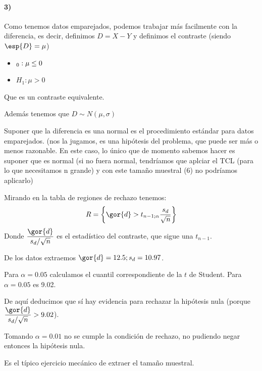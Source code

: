 \begin{problem}[6]
\paragraph{3)} Como tenemos datos emparejados, podemos trabajar más facilmente con la diferencia, es decir, definimos $D=X-Y$ y definimos el contraste (siendo $\esp{D}=\mu$)
\begin{itemize}
\item $\Huge_0 : \mu \leq 0$
\item $H_1: \mu >0$
\end{itemize}

Que es un contraste equivalente.

Además tenemos que $D \sim N(\mu,\sigma)$ 

Suponer que la diferencia es una normal es el procedimiento estándar para datos emparejados. (nos la jugamos, es una hipótesis del problema, que puede ser más o menos razonable. En este caso, lo único que de momento sabemos hacer es suponer que es normal (si no fuera normal, tendríamos que aplciar el TCL (para lo que necesitamos n grande) y con este tamaño muestral (6) no podríamos aplicarlo)

Mirando en la tabla de regiones de rechazo tenemos:
\[R = \left\{\gor{d}> t_{n-1;\alpha} \frac{s_d}{\sqrt{n}}\right\}\]
Donde $\displaystyle \frac{\gor{d}}{s_d/\sqrt{n}}$ es el estadístico del contraste, que sigue una $t_{n-1}$.

De los datos extraemos $\gor{d} = 12.5;s_d=10.97$.

Para $\alpha = 0.05$ calculamos el cuantil correspondiente de la $t$ de Student. Para $\alpha = 0.05$ es 9.02.

De aquí deducimos que sí hay evidencia para rechazar la hipótesis nula (porque  $\displaystyle \frac{\gor{d}}{s_d/\sqrt{n}} > 9.02$).

\spart Tomando $\alpha = 0.01$ no se cumple la condición de rechazo, no pudiendo negar entonces la hipótesis nula.

\spart Es el típico ejercicio mecánico de extraer el tamaño muestral. %
\end{problem}


